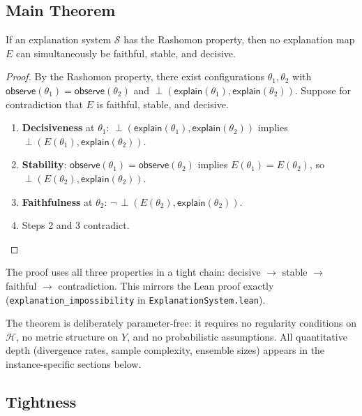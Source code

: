 \documentclass[twoside]{jmlr}
\newcommand{\sH}{\mathcal{H}}
\newcommand{\incomp}{\perp}                  %
\begin{document}
\subsection{Main Theorem}

\begin{theorem}
\label{thm:universal}
If an explanation system $\mathcal{S}$ has the Rashomon property, then no
explanation map $E$ can simultaneously be faithful, stable, and decisive.
\end{theorem}

\begin{proof}
By the Rashomon property, there exist configurations $\theta_1, \theta_2$ with
$\mathsf{observe}(\theta_1) = \mathsf{observe}(\theta_2)$ and
$\incomp(\mathsf{explain}(\theta_1), \mathsf{explain}(\theta_2))$.
Suppose for contradiction that $E$ is faithful, stable, and decisive.
\begin{enumerate}
  \item \textbf{Decisiveness} at $\theta_1$:
    $\incomp(\mathsf{explain}(\theta_1), \mathsf{explain}(\theta_2))$
    implies
    $\incomp(E(\theta_1), \mathsf{explain}(\theta_2))$.
  \item \textbf{Stability}:
    $\mathsf{observe}(\theta_1) = \mathsf{observe}(\theta_2)$
    implies $E(\theta_1) = E(\theta_2)$, so
    $\incomp(E(\theta_2), \mathsf{explain}(\theta_2))$.
  \item \textbf{Faithfulness} at $\theta_2$:
    $\neg\,\incomp(E(\theta_2), \mathsf{explain}(\theta_2))$.
  \item Steps 2 and 3 contradict.
\end{enumerate}
\end{proof}

\begin{remark}
The proof uses all three properties in a tight chain:
decisive $\to$ stable $\to$ faithful $\to$ contradiction.
This mirrors the Lean proof exactly (\texttt{explanation\_impossibility} in
\texttt{ExplanationSystem.lean}).
\end{remark}

\begin{remark}
The theorem is deliberately parameter-free: it requires no regularity
conditions on $\sH$, no metric structure on $Y$, and no probabilistic
assumptions.  All quantitative depth (divergence rates, sample complexity,
ensemble sizes) appears in the instance-specific sections below.
\end{remark}

\subsection{Tightness}
\label{sec:tightness}
\end{document}
